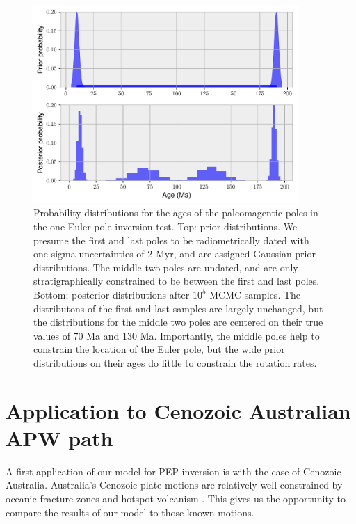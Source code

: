 \documentclass[preprint,12pt,authoryear]{elsarticle}
\begin{document}
\begin{figure}
\includegraphics[width=0.9\textwidth]{figures/synthetic/age_uncertainty_samples.pdf}
\caption[Probability distributions for ages of the paleomagnetic poles in the one-Euler pole inversion test.]{Probability distributions for the ages of the paleomagentic poles in the one-Euler pole inversion test. Top: prior distributions. We presume the first and last poles to be radiometrically dated with one-sigma uncertainties of 2 Myr, and are assigned Gaussian prior distributions. The middle two poles are undated, and are only stratigraphically constrained to be between the first and last poles. Bottom: posterior distributions after $10^5$ MCMC samples. The distributons of the first and last samples are largely unchanged, but the distributions for the middle two poles are centered on their true values of 70 Ma and 130 Ma. Importantly, the middle poles help to constrain the location of the Euler pole, but the wide prior distributions on their ages do little to constrain the rotation rates.}
\label{fig:age_uncertainty_samples}
\end{figure}

\section{Application to Cenozoic Australian APW path}
\label{sec:australia}
A first application of our model for PEP inversion is with the case of Cenozoic Australia.
Australia's Cenozoic plate motions are relatively well constrained by oceanic fracture zones
and hotspot volcanism \citep{muller1993revised, seton2012global}.
This gives us the opportunity to compare the results of our model to those known motions.
\end{document}
